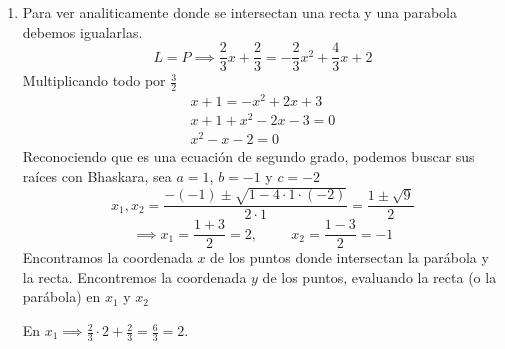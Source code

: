 \documentclass[12pt]{article}
\begin{document}
\begin{enumerate}
\begin{enumerate}
\begin{figure}[H]
            \caption{Gráfica de $f(x) = -\frac{2}{3}x^2 + \frac{4}{3}x + 2$}
            \end{figure}

            \item Para ver analiticamente donde se intersectan una recta y una parabola debemos igualarlas.
            \begin{equation*}
                L=P \implies \frac{2}{3}x +\frac{2}{3} = -\frac{2}{3} x^2+\frac{4}{3}x+2
            \end{equation*}
            Multiplicando todo por $\frac{3}{2}$
            \begin{gather*}
                x + 1 = -x^{2}+2x+3 \\
                x +1 +x^2-2x-3 = 0\\
                x^2-x-2 = 0
            \end{gather*}
            Reconociendo que es una ecuación de segundo grado, podemos buscar sus raíces con Bhaskara, sea $a=1$, $b=-1$ y $c=-2$
            \begin{equation*}
                x_1,x_2 = \frac{-(-1)\pm \sqrt{1-4\cdot1\cdot (-2)}}{2\cdot 1} = \frac{1\pm \sqrt{9}}{2}
            \end{equation*}
            \begin{equation*}
                \implies x_1 =\frac{1+3}{2}=2, \hspace{1cm} x_2 = \frac{1-3}{2} =-1
            \end{equation*}
            Encontramos la coordenada $x$ de los puntos donde intersectan la parábola y la recta. Encontremos la coordenada $y$ de los puntos, evaluando la recta (o la parábola) en $x_1$ y $x_2$

            En $x_1 \implies \frac{2}{3}\cdot 2 + \frac{2}{3} = \frac{6}{3} = 2$.
            

\end{enumerate}
\end{enumerate}
\end{document}
